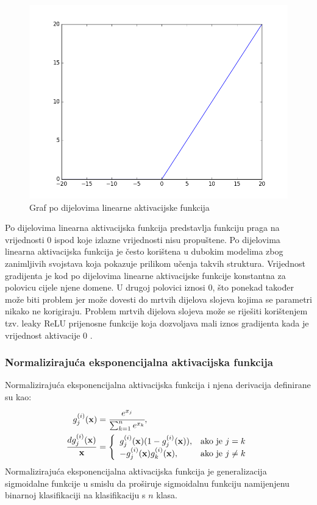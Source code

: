\documentclass[times, utf8, diplomski, numeric]{fer}
\begin{document}
\begin{figure}[H]
\centering
\includegraphics[scale=0.5]{images/relu_graph.png}
\caption{Graf po dijelovima linearne aktivacijske funkcija}
\label{img:relu_graph}
\end{figure}

\noindent Po dijelovima linearna aktivacijska funkcija predstavlja funkciju praga na vrijednosti $0$ ispod koje izlazne vrijednosti nisu propuštene.
Po dijelovima linearna aktivacijska funkcija je često korištena u dubokim modelima zbog zanimljivih svojstava koja pokazuje prilikom učenja takvih struktura.
Vrijednost gradijenta je kod po dijelovima linearne aktivacijske funkcije konstantna za polovicu cijele njene domene. 
U drugoj polovici iznosi $0$, što ponekad također može biti problem jer može dovesti do mrtvih dijelova slojeva kojima se parametri nikako ne korigiraju.
Problem mrtvih dijelova slojeva može se riješiti korištenjem tzv. leaky ReLU prijenosne funkcije koja dozvoljava mali iznos gradijenta kada je vrijednost aktivacije $0$ \citep{book:deeplearningbook} \citep{seminar:rela}.

\subsubsection{Normalizirajuća eksponencijalna aktivacijska funkcija}
Normalizirajuća eksponencijalna aktivacijska funkcija  i njena derivacija definirane su kao:
\begin{align}
 g^{(i)}_j(\mathbf{x})&=\cfrac{e^{x_j}}{\sum_{k=1}^{n} e^{x_k}}, \\
 \frac{dg^{(i)}_j(\mathbf{x})}{\mathbf{x}}&=\left\{
 \begin{array}{ll}
 g^{(i)}_j(\mathbf{x}) (1-g^{(i)}_j(\mathbf{x})),  & \mbox{ako je } j = k \\
 -g^{(i)}_j(\mathbf{x}) g^{(i)}_k(\mathbf{x}), & \mbox{ako je } j \neq k 
 \end{array}
 \right.
\end{align}
Normalizirajuća eksponencijalna aktivacijska funkcija je generalizacija sigmoidalne funkcije u smislu da proširuje sigmoidalnu funkciju namijenjenu binarnoj klasifikaciji na klasifikaciju s $n$ klasa.
\end{document}

